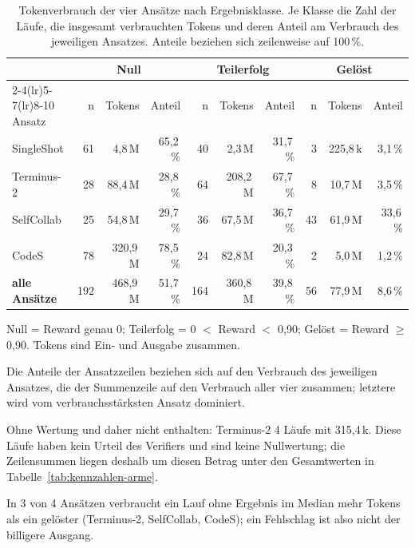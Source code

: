 \begin{table}[H]
  \centering
  \begin{threeparttable}
    \caption[Tokenverbrauch nach Ergebnisklasse]{Tokenverbrauch der vier Ansätze nach Ergebnisklasse. Je Klasse die Zahl der Läufe, die insgesamt verbrauchten Tokens und deren Anteil am Verbrauch des jeweiligen Ansatzes. Anteile beziehen sich zeilenweise auf 100\,\%.}
    \label{tab:tokens-ergebnisklasse}
    \footnotesize
    \begin{tabularx}{\textwidth}{@{}Xrrrrrrrrr@{}}
      \toprule
       & \multicolumn{3}{c}{Null} & \multicolumn{3}{c}{Teilerfolg} & \multicolumn{3}{c}{Gelöst} \\ \cmidrule(lr){2-4}\cmidrule(lr){5-7}\cmidrule(lr){8-10}
      Ansatz & n & Tokens & Anteil & n & Tokens & Anteil & n & Tokens & Anteil \\
      \midrule
      SingleShot & 61 & 4,8\,M & 65,2\,\% & 40 & 2,3\,M & 31,7\,\% & 3 & 225,8\,k & 3,1\,\% \\
      Terminus-2 & 28 & 88,4\,M & 28,8\,\% & 64 & 208,2\,M & 67,7\,\% & 8 & 10,7\,M & 3,5\,\% \\
      SelfCollab & 25 & 54,8\,M & 29,7\,\% & 36 & 67,5\,M & 36,7\,\% & 43 & 61,9\,M & 33,6\,\% \\
      CodeS & 78 & 320,9\,M & 78,5\,\% & 24 & 82,8\,M & 20,3\,\% & 2 & 5,0\,M & 1,2\,\% \\
      \midrule
      \textbf{alle Ansätze} & 192 & 468,9\,M & 51,7\,\% & 164 & 360,8\,M & 39,8\,\% & 56 & 77,9\,M & 8,6\,\% \\
      \bottomrule
    \end{tabularx}
    \begin{tablenotes}[flushleft]
      \footnotesize
      \item[] Null = Reward genau 0; Teilerfolg = 0 $<$ Reward $<$ 0,90; Gelöst = Reward $\geq$ 0,90. Tokens sind Ein- und Ausgabe zusammen.
      \item[] Die Anteile der Ansatzzeilen beziehen sich auf den Verbrauch des jeweiligen Ansatzes, die der Summenzeile auf den Verbrauch aller vier zusammen; letztere wird vom verbrauchsstärksten Ansatz dominiert.
      \item[] Ohne Wertung und daher nicht enthalten: Terminus-2 4 Läufe mit 315,4\,k. Diese Läufe haben kein Urteil des Verifiers und sind keine Nullwertung; die Zeilensummen liegen deshalb um diesen Betrag unter den Gesamtwerten in Tabelle~\ref{tab:kennzahlen-arme}.
      \item[] In 3 von 4 Ansätzen verbraucht ein Lauf ohne Ergebnis im Median mehr Tokens als ein gelöster (Terminus-2, SelfCollab, CodeS); ein Fehlschlag ist also nicht der billigere Ausgang.
    \end{tablenotes}
  \end{threeparttable}
\end{table}
